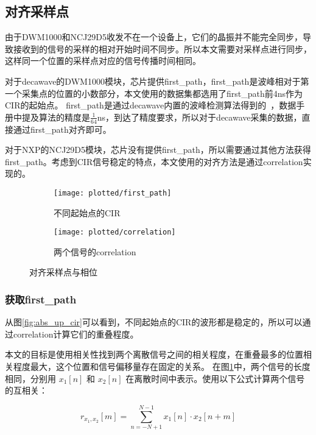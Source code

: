\subsection{对齐采样点}
由于DWM1000和NCJ29D5收发不在一个设备上，它们的晶振并不能完全同步，导致接收到的信号的采样的相对开始时间不同步。所以本文需要对采样点进行同步，这样同一个位置的采样点对应的信号传播时间相同。

对于decawave的DWM1000模块，芯片提供first\_path，first\_path是波峰相对于第一个采集点的位置的小数部分，本文使用的数据集都选用了first\_path前4ns作为CIR的起始点。
first\_path是通过decawave内置的波峰检测算法得到的~\cite{dwm1000_user_manual}，数据手册中提及算法的精度是\(\frac{1}{64}\)ns，到达了精度要求，所以对于decawave采集的数据，直接通过first\_path对齐即可。

对于NXP的NCJ29D5模块，芯片没有提供first\_path，所以需要通过其他方法获得first\_path。考虑到CIR信号稳定的特点，本文使用的对齐方法是通过correlation实现的。

\begin{figure}[htbp]
    \centering
    \begin{subfigure}{0.9\textwidth}
        \centering
        \texttt{[image: plotted/first\_path]}
        \caption{\label{fig:first_path}不同起始点的CIR}
    \end{subfigure}%

    \centering
    \begin{subfigure}{0.9\textwidth}
        \centering
        \texttt{[image: plotted/correlation]}
        \caption{\label{fig:correlation}两个信号的correlation}
    \end{subfigure}%

    \caption{对齐采样点与相位}
    \label{fig:first_path_and_correlation}
\end{figure}
\subsubsection{获取first\_path}
从图\ref{fig:abs_up_cir}可以看到，不同起始点的CIR的波形都是稳定的，所以可以通过correlation计算它们的重叠程度。

本文的目标是使用相关性找到两个离散信号之间的相关程度，在重叠最多的位置相关程度最大，这个位置和信号偏移量存在固定的关系。
在图\ref{fig:first_path}中，两个信号的长度相同，分别用 \( x_1[n] \) 和 \( x_2[n] \) 在离散时间中表示。使用以下公式计算两个信号的互相关：

\[
r_{x_1, x_2}[m] = \sum_{n=-N+1}^{N-1} x_1[n] \cdot x_2[n+m]
\]

